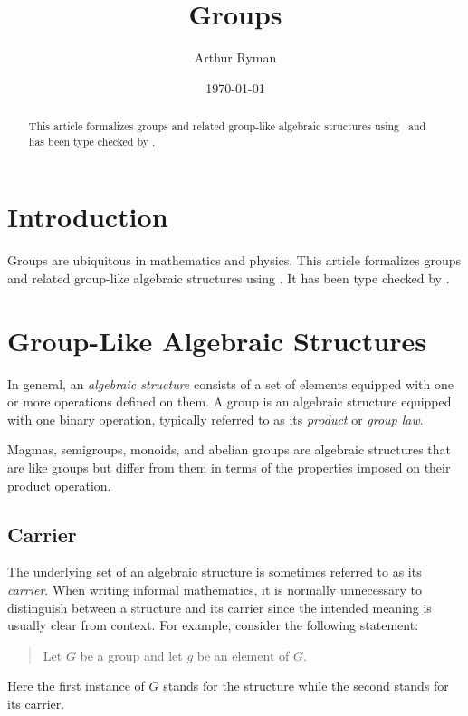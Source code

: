 \documentclass{amsart}
\begin{document}
\title{Groups}
\author{Arthur Ryman}
\date{\today}

\begin{abstract}
	This article formalizes groups and related group-like algebraic structures using 
	\ZN\ and has been type checked by \fuzz.
\end{abstract}

\maketitle

\tableofcontents

\section{Introduction}

Groups are ubiquitous in mathematics and physics.
This article formalizes groups and related group-like algebraic structures using 
\ZN\cite{spivey-zrm}.
It has been type checked by \fuzz\cite{spivey-fm}.

\section{Group-Like Algebraic Structures}

In general, an \textit{algebraic structure} consists of a set of elements 
equipped with one or more operations defined on them.
A group is an algebraic structure equipped with one binary operation, typically referred to
as its \textit{product} or \textit{group law}.

Magmas, semigroups, monoids, and abelian groups are 
algebraic structures that are like groups but differ from them 
in terms of the properties imposed on their product operation.

\subsection{Carrier}

The underlying set of an algebraic structure is sometimes referred to as its \textit{carrier}.
When writing informal mathematics, 
it is normally unnecessary to distinguish between a structure and its carrier
since the intended meaning is usually clear from context.
For example, consider the following statement:
\begin{quote}
	Let $G$ be a group and let $g$ be an element of $G$.
\end{quote}
Here the first instance of $G$ stands for the structure while the second stands for its carrier.
\end{document}
